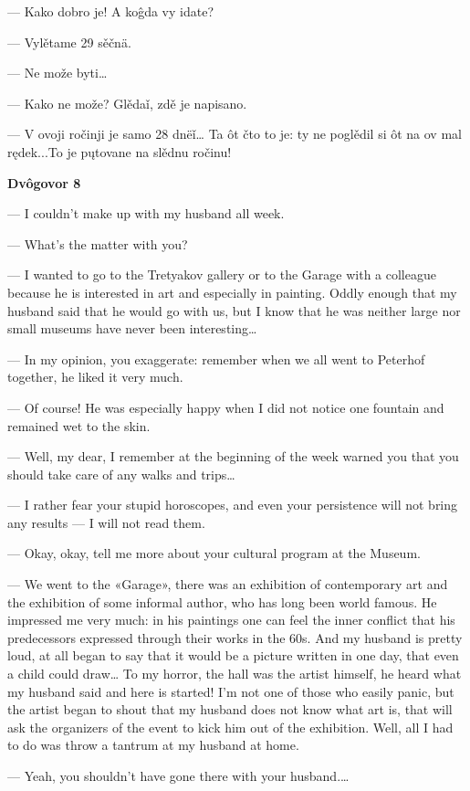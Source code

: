 — Kako dobro je! A koĝda vy idate?

— Vylětame 29 sěčnä.

— Ne može byti…

— Kako ne može? Glědaǐ, zdě je napisano.

— V ovoji ročinji je samo 28 dnëǐ… Ta ôt čto to je: ty ne poglědil si ôt na ov mal rędek...To je pųtovane na slědnu ročinu!


\textbf{Dvôgovor 8}


— I couldn’t make up with my husband all week.

— What’s the matter with you?

— I wanted to go to the Tretyakov gallery or to the Garage with a colleague because he is interested in art and especially in painting. Oddly enough that my husband said that he would go with us, but I know that he was neither large nor small museums have never been interesting…

— In my opinion, you exaggerate: remember when we all went to Peterhof together, he liked it very much.

— Of course! He was especially happy when I did not notice one fountain and remained wet to the skin.

— Well, my dear, I remember at the beginning of the week warned you that you should take care of any walks and trips…

— I rather fear your stupid horoscopes, and even your persistence will not bring any results — I will not read them.

— Okay, okay, tell me more about your cultural program at the Museum.

— We went to the «Garage», there was an exhibition of contemporary art and the exhibition of some informal author, who has long been world famous. He impressed me very much: in his paintings one can feel the inner conflict that his predecessors expressed through their works in the 60s. And my husband is pretty loud, at all began to say that it would be a picture written in one day, that even a child could draw… To my horror, the hall was the artist himself, he heard what my husband said and here is started! I’m not one of those who easily panic, but the artist began to shout that my husband does not know what art is, that will ask the organizers of the event to kick him out of the exhibition. Well, all I had to do was throw a tantrum at my husband at home.

— Yeah, you shouldn’t have gone there with your husband.…

